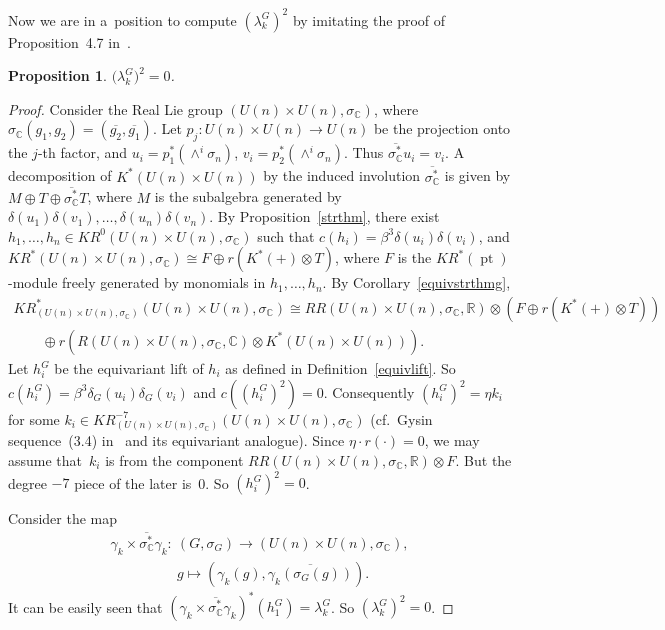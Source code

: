 \documentclass[pdftex]{sigma}
\numberwithin{equation}{section}
\newtheorem{Proposition}[Theorem]{Proposition}
{\theoremstyle{definition}
\newtheorem{Definition}[Theorem]{Definition}
\newtheorem{Example}[Theorem]{Example}
\newtheorem{Remark}[Theorem]{Remark}
}
\DeclareMathOperator{\pt}{pt}
\begin{document}
Now we are in a~position to compute $(\lambda_k^G)^2$ by imitating the proof of Proposition~4.7 in~\cite{Se}.
\begin{Proposition}
\label{cplxsquare}
$\big(\lambda_k^G\big)^2=0$.
\end{Proposition}
\begin{proof}
Consider the Real Lie group $(U(n)\times U(n),
\sigma_\mathbb{C})$, where $\sigma_\mathbb{C}
(g_1, g_2)=(\overline{g_2}, \overline{g_1})$.
Let $p_j: U(n)\times U(n)\to U(n)$ be the projection onto the $j$-th factor, and $u_i=p_1^*(\wedge^i
\sigma_n)$, $v_i=p_2^*(\wedge^i\sigma_n)$.
Thus $\overline{\sigma_\mathbb{C}^*}u_i=v_i$.
A decomposition of $K^*(U(n)\times U(n))$ by the induced involution $\overline{\sigma_\mathbb{C}^*}$ is given by $M\oplus T\oplus \overline{\sigma_\mathbb{C}^*}T$, where $M$ is the subalgebra generated by $\delta(u_1)\delta(v_1), \dots, \delta(u_n)\delta(v_n)$.
By Proposition~\ref{strthm}, there exist $h_1, \dots, h_n\in KR^0(U(n)\times U(n),
\sigma_\mathbb{C})$ such that $c(h_i)=\beta^3\delta(u_i)\delta(v_i)$, and $KR^*(U(n)\times U(n),
\sigma_\mathbb{C})\cong F\oplus r(K^*(+)\otimes T)$, where $F$ is the $KR^*(\pt)$-module freely generated by monomials in $h_1,
\dots, h_n$.
By Corollary~\ref{equivstrthmg},
\begin{gather*}
KR^*_{(U(n)\times U(n),
\sigma_\mathbb{C})}(U(n)\times U(n),
\sigma_\mathbb{C})
\cong
RR(U(n)\times U(n),
\sigma_\mathbb{C}, \mathbb{R})\otimes(F\oplus r(K^*(+)\otimes T))
\\
\qquad{}
\oplus
r(R(U(n)\times U(n),
\sigma_\mathbb{C}, \mathbb{C})\otimes K^*(U(n)\times U(n))).
\end{gather*}
Let $h_i^G$ be the equivariant lift of $h_i$ as def\/ined in Def\/inition~\ref{equivlift}.
So $c(h_i^G)=\beta^3\delta_G(u_i)\delta_G(v_i)$ and $c((h_i^G)^2)=0$.
Consequently $(h_i^G)^2=\eta k_i$ for some $k_i\in KR^{-7}_{(U(n)\times U(n),
\sigma_\mathbb{C})}(U(n)\times U(n),
\sigma_\mathbb{C})$ (cf.\ Gysin sequence~(3.4) in~\cite{At3} and its equivariant analogue).
Since $\eta\cdot r(\cdot)=0$, we may assume that~$k_i$ is from the component $RR(U(n)\times U(n),
\sigma_\mathbb{C}, \mathbb{R})\otimes F$.
But the degree $-7$ piece of the later is~0.
So $(h_i^G)^2=0$.

Consider the map
\begin{gather*}
\gamma_k\times \overline{\sigma_\mathbb{C}^*}\gamma_k: \ (G,\sigma_G)  \to (U(n)\times U(n), \sigma_\mathbb{C}),
\\
\phantom{\gamma_k\times \overline{\sigma_\mathbb{C}^*}\gamma_k: {}} \
g  \mapsto  (\gamma_k(g), \overline{\gamma_k(\sigma_G(g))}).
\end{gather*}
It can be easily seen that $(\gamma_k\times\overline{\sigma_\mathbb{C}^*}\gamma_k)^*(h_1^G)=\lambda_k^G$.
So $(\lambda_k^G)^2=0$.
\end{proof}
\end{document}
